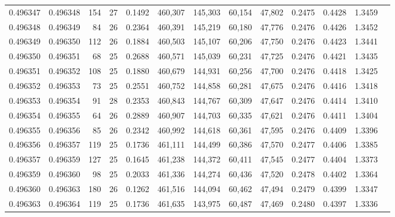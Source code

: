 \begin{tabular}{rrrrrrrrrrrrr}
0.496347 & 0.496348 & 154 &  27 &                                     0.1492 & 460,307 & 145,303 &  60,154 &  47,802 & 0.2475 & 0.4428 & 1.3459 \\
0.496348 & 0.496349 &  84 &  26 &                                     0.2364 & 460,391 & 145,219 &  60,180 &  47,776 & 0.2476 & 0.4426 & 1.3452 \\
0.496349 & 0.496350 & 112 &  26 &                                     0.1884 & 460,503 & 145,107 &  60,206 &  47,750 & 0.2476 & 0.4423 & 1.3441 \\
0.496350 & 0.496351 &  68 &  25 &                                     0.2688 & 460,571 & 145,039 &  60,231 &  47,725 & 0.2476 & 0.4421 & 1.3435 \\
0.496351 & 0.496352 & 108 &  25 &                                     0.1880 & 460,679 & 144,931 &  60,256 &  47,700 & 0.2476 & 0.4418 & 1.3425 \\
0.496352 & 0.496353 &  73 &  25 &                                     0.2551 & 460,752 & 144,858 &  60,281 &  47,675 & 0.2476 & 0.4416 & 1.3418 \\
0.496353 & 0.496354 &  91 &  28 &                                     0.2353 & 460,843 & 144,767 &  60,309 &  47,647 & 0.2476 & 0.4414 & 1.3410 \\
0.496354 & 0.496355 &  64 &  26 &                                     0.2889 & 460,907 & 144,703 &  60,335 &  47,621 & 0.2476 & 0.4411 & 1.3404 \\
0.496355 & 0.496356 &  85 &  26 &                                     0.2342 & 460,992 & 144,618 &  60,361 &  47,595 & 0.2476 & 0.4409 & 1.3396 \\
0.496356 & 0.496357 & 119 &  25 &                                     0.1736 & 461,111 & 144,499 &  60,386 &  47,570 & 0.2477 & 0.4406 & 1.3385 \\
0.496357 & 0.496359 & 127 &  25 &                                     0.1645 & 461,238 & 144,372 &  60,411 &  47,545 & 0.2477 & 0.4404 & 1.3373 \\
0.496359 & 0.496360 &  98 &  25 &                                     0.2033 & 461,336 & 144,274 &  60,436 &  47,520 & 0.2478 & 0.4402 & 1.3364 \\
0.496360 & 0.496363 & 180 &  26 &                                     0.1262 & 461,516 & 144,094 &  60,462 &  47,494 & 0.2479 & 0.4399 & 1.3347 \\
0.496363 & 0.496364 & 119 &  25 &                                     0.1736 & 461,635 & 143,975 &  60,487 &  47,469 & 0.2480 & 0.4397 & 1.3336 \\

\end{tabular}
